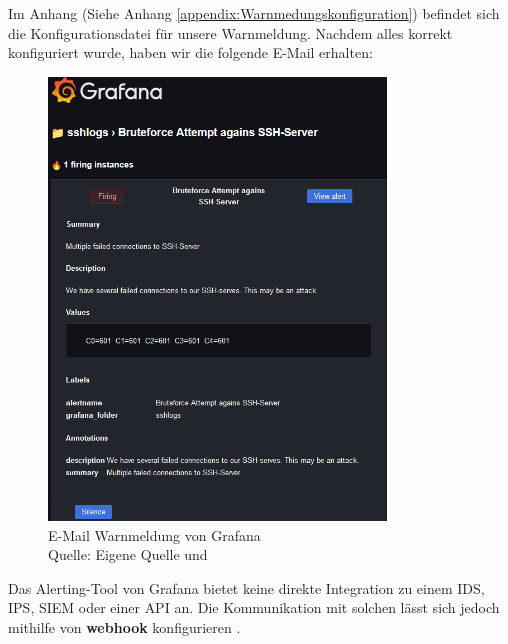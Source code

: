 
Im Anhang (Siehe Anhang \ref{appendix:Warnmedungskonfiguration}) befindet sich die Konfigurationsdatei für unsere Warnmeldung. Nachdem alles korrekt konfiguriert wurde, haben wir die folgende E-Mail erhalten:

\begin{figure}[H]
   \centering
   \includegraphics[width=0.8\textwidth]{assets/GrafanaWarnmeldung.png}
   \caption{E-Mail Warnmeldung von Grafana \\Quelle: Eigene Quelle und \citep{Grafana_alerting}}
   \centering
\end{figure}

Das Alerting-Tool von Grafana bietet keine direkte Integration zu einem \gls{IDS}, \gls{IPS}, \gls{SIEM} oder einer \gls{API} an. Die Kommunikation mit solchen  lässt sich jedoch mithilfe von \textbf{\gls{webhook}} konfigurieren \citep{Grafana_Notifications}.

